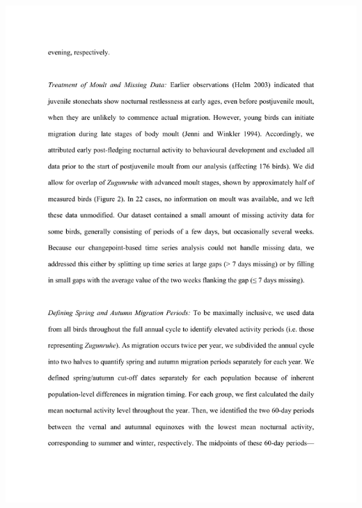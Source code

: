 \documentclass[a4paper, twoside]{templates/ociamthesis}
\begin{document}
\includegraphics[width=1\linewidth]{pdf_chapters/zug/zug_supp_crop_Part4}
\end{document}
